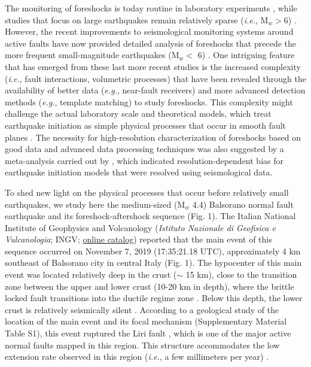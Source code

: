 \documentclass[a4paper,12pt,twoside]{article}
\begin{document}
The monitoring of foreshocks is today routine in laboratory experiments \citep[][and references therein]{Zang_1998_SAA, Goebel_2012_IFH, Renard_2019_VSP}, while  studies that focus on large earthquakes remain relatively sparse (\emph{i.e.}, M$_w>$6) \citep[\emph{e.g.},][]{Mogi_1963_SDA, Abercrombie_1996_OPF, Kato_2012_PSS, Chen_2013_CFS, Bouchon_2013_LPP, Ruiz_2014_IFS, ruiz2014intense}. However, the recent improvements to seismological monitoring systems around active faults have now provided detailed analysis of foreshocks that precede the more frequent small-magnitude earthquakes (M$_w <$ 6) \citep[\emph{e.g.},][]{Savage_2017_PPS, Mcmahon_2017_STE, Malin_2018_MPE}. One intriguing feature that has emerged from these last more recent studies is the increased complexity (\emph{i.e.}, fault interactions, volumetric processes) that have been revealed through the availability of better data (\emph{e.g.}, near-fault receivers) and more advanced detection methods (\emph{e.g.}, template matching) to study foreshocks. This complexity might challenge the actual laboratory scale and theoretical models, which treat earthquake initiation as simple physical processes that occur in smooth fault planes \citep{Dieterich_1992_ENF, Marone_1998_ELR, Rubin_2005_ENR, Liu_2005_AST}. The necessity for high-resolution characterization of foreshocks based on good data and advanced data processing techniques was also suggested by a meta-analysis carried out by \cite{Mignan_2014_DPV}, which indicated resolution-dependent bias for earthquake initiation models that were resolved using seismological data. 

To shed new light on the physical processes that occur before relatively small earthquakes, we study here the medium-sized (M$_w$ 4.4) Balsorano normal fault earthquake and its foreshock-aftershock sequence (Fig. 1). The Italian National Institute of Geophysics and Volcanology (\emph{Istituto Nazionale di Geofisica e Vulcanologia}; INGV; \href{http://terremoti.ingv.it/it/event/23414191}{\color{blue}online catalog}) reported that the main event of this sequence occurred on November 7, 2019 (17:35:21.18 UTC), approximately 4 km southeast of Balsorano city in central Italy (Fig. 1). The hypocenter of this main event was located relatively deep in the crust ($\sim$ 15 km), close to the transition zone between the upper and lower crust (10-20 km in depth), where the brittle locked fault transitions into the ductile regime zone \citep{Doglion_2011_RBD}. Below this depth, the lower crust is relatively seismically silent \citep{Doglion_2011_RBD}. According to a geological study of the location of the main event and its focal mechanism (Supplementary Material Table S1), this event ruptured the Liri fault \citep{Roberts_2004_STV}, which is one of the major active normal faults mapped in this region. This structure accommodates the  low extension rate observed in this region (\emph{i.e.}, a few millimeters per year) \citep{Hunstad_1999_UBR, Westaway_1992_SMS, Dagostino_2001a_ACE, Roberts_2004_STV}.
\end{document}
